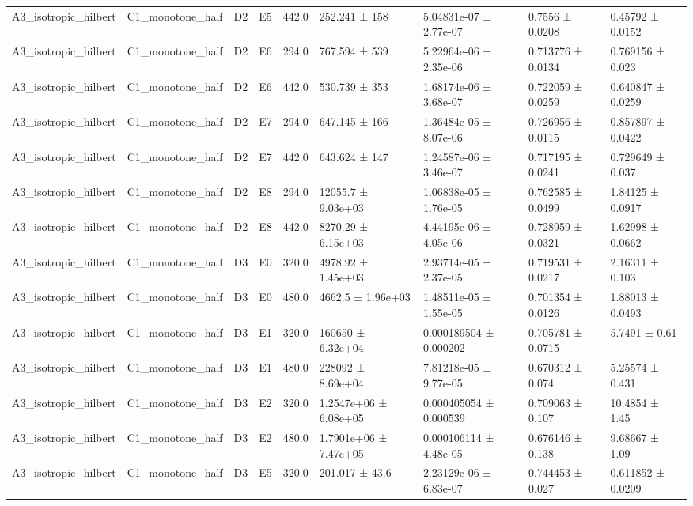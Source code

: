 \begin{table}
\begin{tabular}{lllllllll}
A3\_isotropic\_hilbert & C1\_monotone\_half & D2 & E5 & 442.0 & 252.241 ± 158 & 5.04831e-07 ± 2.77e-07 & 0.7556 ± 0.0208 & 0.45792 ± 0.0152 \\
A3\_isotropic\_hilbert & C1\_monotone\_half & D2 & E6 & 294.0 & 767.594 ± 539 & 5.22964e-06 ± 2.35e-06 & 0.713776 ± 0.0134 & 0.769156 ± 0.023 \\
A3\_isotropic\_hilbert & C1\_monotone\_half & D2 & E6 & 442.0 & 530.739 ± 353 & 1.68174e-06 ± 3.68e-07 & 0.722059 ± 0.0259 & 0.640847 ± 0.0259 \\
A3\_isotropic\_hilbert & C1\_monotone\_half & D2 & E7 & 294.0 & 647.145 ± 166 & 1.36484e-05 ± 8.07e-06 & 0.726956 ± 0.0115 & 0.857897 ± 0.0422 \\
A3\_isotropic\_hilbert & C1\_monotone\_half & D2 & E7 & 442.0 & 643.624 ± 147 & 1.24587e-06 ± 3.46e-07 & 0.717195 ± 0.0241 & 0.729649 ± 0.037 \\
A3\_isotropic\_hilbert & C1\_monotone\_half & D2 & E8 & 294.0 & 12055.7 ± 9.03e+03 & 1.06838e-05 ± 1.76e-05 & 0.762585 ± 0.0499 & 1.84125 ± 0.0917 \\
A3\_isotropic\_hilbert & C1\_monotone\_half & D2 & E8 & 442.0 & 8270.29 ± 6.15e+03 & 4.44195e-06 ± 4.05e-06 & 0.728959 ± 0.0321 & 1.62998 ± 0.0662 \\
A3\_isotropic\_hilbert & C1\_monotone\_half & D3 & E0 & 320.0 & 4978.92 ± 1.45e+03 & 2.93714e-05 ± 2.37e-05 & 0.719531 ± 0.0217 & 2.16311 ± 0.103 \\
A3\_isotropic\_hilbert & C1\_monotone\_half & D3 & E0 & 480.0 & 4662.5 ± 1.96e+03 & 1.48511e-05 ± 1.55e-05 & 0.701354 ± 0.0126 & 1.88013 ± 0.0493 \\
A3\_isotropic\_hilbert & C1\_monotone\_half & D3 & E1 & 320.0 & 160650 ± 6.32e+04 & 0.000189504 ± 0.000202 & 0.705781 ± 0.0715 & 5.7491 ± 0.61 \\
A3\_isotropic\_hilbert & C1\_monotone\_half & D3 & E1 & 480.0 & 228092 ± 8.69e+04 & 7.81218e-05 ± 9.77e-05 & 0.670312 ± 0.074 & 5.25574 ± 0.431 \\
A3\_isotropic\_hilbert & C1\_monotone\_half & D3 & E2 & 320.0 & 1.2547e+06 ± 6.08e+05 & 0.000405054 ± 0.000539 & 0.709063 ± 0.107 & 10.4854 ± 1.45 \\
A3\_isotropic\_hilbert & C1\_monotone\_half & D3 & E2 & 480.0 & 1.7901e+06 ± 7.47e+05 & 0.000106114 ± 4.48e-05 & 0.676146 ± 0.138 & 9.68667 ± 1.09 \\
A3\_isotropic\_hilbert & C1\_monotone\_half & D3 & E5 & 320.0 & 201.017 ± 43.6 & 2.23129e-06 ± 6.83e-07 & 0.744453 ± 0.027 & 0.611852 ± 0.0209 \\

\end{tabular}
\end{table}
